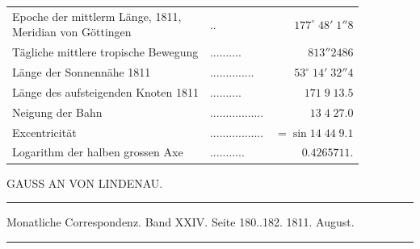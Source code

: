 \begin{center}\fontsize{10}{12}\selectfont\setlength{\tabcolsep}{4pt}\renewcommand{\arraystretch}{1.15}\begin{tabular}{llr}
\shortstack[l]{Epoche der mittlerm Länge, 1811,\\Meridian von Göttingen} & .\;. & $177^\circ\;48'\;1''8$\\
Tägliche mittlere tropische Bewegung & .\;.\;.\;.\;.\;.\;.\;.\;.\;. & $813''2486$\\
Länge der Sonnennähe 1811 & .\;.\;.\;.\;.\;.\;.\;.\;.\;.\;.\;.\;.\;. & $53^\circ\;14'\;32''4$\\
Länge des aufsteigenden Knoten 1811 & .\;.\;.\;.\;.\;.\;.\;.\;.\;. & $171\;9\;13.5$\\
Neigung der Bahn & .\;.\;.\;.\;.\;.\;.\;.\;.\;.\;.\;.\;.\;.\;.\;.\;. & $13\;4\;27.0$\\
Excentricität & .\;.\;.\;.\;.\;.\;.\;.\;.\;.\;.\;.\;.\;.\;.\;.\;. & $=\sin14\;44\;9.1$\\
Logarithm der halben grossen Axe & .\;.\;.\;.\;.\;.\;.\;.\;.\;.\;. & $0.4265711.$\\
\end{tabular}\end{center}
\par\bigskip
{}
\hypertarget{native-331-lower}{}\label{native-331-lower}
\begin{center}\large GAUSS AN VON LINDENAU.\end{center}
\begin{center}\parbox{.86\linewidth}{\centering\footnotesize\frenchspacing
\hrule height .3pt\relax\vspace{2.5pt}
Monatliche Correspondenz. Band XXIV. Seite 180..182. 1811. August.\par
\vspace{2.5pt}\hrule height .3pt\relax
}\end{center}

